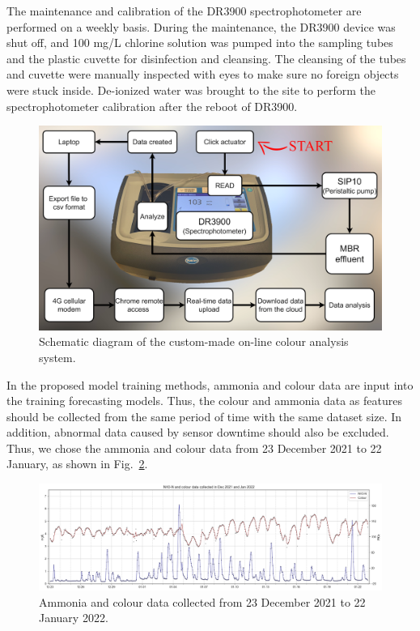 The maintenance and calibration of the DR3900 spectrophotometer are performed on a weekly basis. During the maintenance, the DR3900 device was shut off, and 100 mg/L chlorine solution was pumped into the sampling tubes and the plastic cuvette for disinfection and cleansing. The cleansing of the tubes and cuvette were manually inspected with eyes to make sure no foreign objects were stuck inside. De-ionized water was brought to the site to perform the spectrophotometer calibration after the reboot of DR3900. 

\begin{figure}[h]
    \centering
    \includegraphics[width=0.8\columnwidth]{imgs/instrument/colour-sampler.png}
    \caption{Schematic diagram of the custom-made on-line colour analysis system.}
    \label{fig:diagram-colour-analysis}
 \end{figure}

 In the proposed model training methods, ammonia and colour data are input into the training forecasting models. Thus, the colour and ammonia data as features should be collected from the same period of time with the same dataset size. In addition, abnormal data caused by sensor downtime should also be excluded. Thus, we chose the ammonia and colour data from 23 December 2021 to 22 January, as shown in Fig.~\ref{fig:nh3-color-data}.

\begin{figure}[h]
    \centering
    \includegraphics[width=1.0\columnwidth]{imgs/results/data.png}
    \caption{Ammonia and colour data collected from 23 December 2021 to 22  January 2022.}
    \label{fig:nh3-color-data}
\end{figure}

